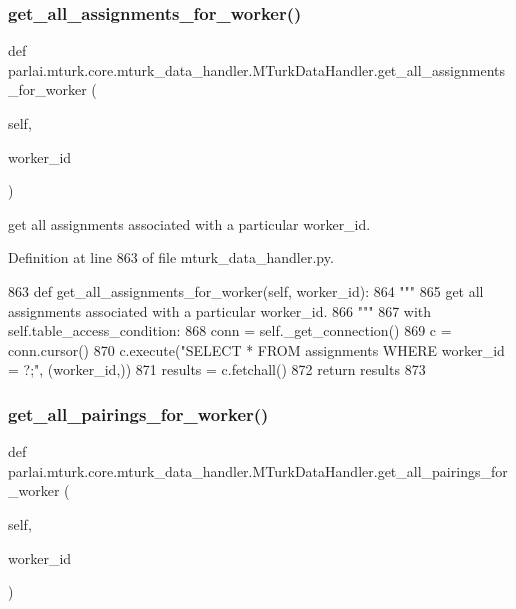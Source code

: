 \subsubsection{\texorpdfstring{get\+\_\+all\+\_\+assignments\+\_\+for\+\_\+worker()}{get\_all\_assignments\_for\_worker()}}
{\footnotesize\ttfamily def parlai.\+mturk.\+core.\+mturk\+\_\+data\+\_\+handler.\+M\+Turk\+Data\+Handler.\+get\+\_\+all\+\_\+assignments\+\_\+for\+\_\+worker (\begin{DoxyParamCaption}\item[{}]{self,  }\item[{}]{worker\+\_\+id }\end{DoxyParamCaption})}

\begin{DoxyVerb}get all assignments associated with a particular worker_id.
\end{DoxyVerb}
 

Definition at line 863 of file mturk\+\_\+data\+\_\+handler.\+py.


\begin{DoxyCode}
863     \textcolor{keyword}{def }get\_all\_assignments\_for\_worker(self, worker\_id):
864         \textcolor{stringliteral}{"""}
865 \textcolor{stringliteral}{        get all assignments associated with a particular worker\_id.}
866 \textcolor{stringliteral}{        """}
867         with self.table\_access\_condition:
868             conn = self.\_get\_connection()
869             c = conn.cursor()
870             c.execute(\textcolor{stringliteral}{"SELECT * FROM assignments WHERE worker\_id = ?;"}, (worker\_id,))
871             results = c.fetchall()
872             \textcolor{keywordflow}{return} results
873 
\end{DoxyCode}
\mbox{\label{classparlai_1_1mturk_1_1core_1_1mturk__data__handler_1_1MTurkDataHandler_af115126a912672f030143d16b281c1d3}} 
\subsubsection{\texorpdfstring{get\+\_\+all\+\_\+pairings\+\_\+for\+\_\+worker()}{get\_all\_pairings\_for\_worker()}}
{\footnotesize\ttfamily def parlai.\+mturk.\+core.\+mturk\+\_\+data\+\_\+handler.\+M\+Turk\+Data\+Handler.\+get\+\_\+all\+\_\+pairings\+\_\+for\+\_\+worker (\begin{DoxyParamCaption}\item[{}]{self,  }\item[{}]{worker\+\_\+id }\end{DoxyParamCaption})}

